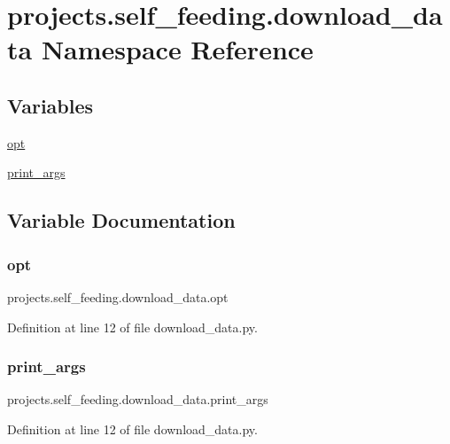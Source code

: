 \hypertarget{namespaceprojects_1_1self__feeding_1_1download__data}{}\section{projects.\+self\+\_\+feeding.\+download\+\_\+data Namespace Reference}
\label{namespaceprojects_1_1self__feeding_1_1download__data}
\subsection*{Variables}
\begin{DoxyCompactItemize}
\item 
\hyperlink{namespaceprojects_1_1self__feeding_1_1download__data_a3a83021b7f75b0049b614777fa616568}{opt}
\item 
\hyperlink{namespaceprojects_1_1self__feeding_1_1download__data_abbbc6347e942e51a775ed5cbade72dad}{print\+\_\+args}
\end{DoxyCompactItemize}


\subsection{Variable Documentation}
\mbox{\label{namespaceprojects_1_1self__feeding_1_1download__data_a3a83021b7f75b0049b614777fa616568}} 
\subsubsection{\texorpdfstring{opt}{opt}}
{\footnotesize\ttfamily projects.\+self\+\_\+feeding.\+download\+\_\+data.\+opt}



Definition at line 12 of file download\+\_\+data.\+py.

\mbox{\label{namespaceprojects_1_1self__feeding_1_1download__data_abbbc6347e942e51a775ed5cbade72dad}} 
\subsubsection{\texorpdfstring{print\+\_\+args}{print\_args}}
{\footnotesize\ttfamily projects.\+self\+\_\+feeding.\+download\+\_\+data.\+print\+\_\+args}



Definition at line 12 of file download\+\_\+data.\+py.

